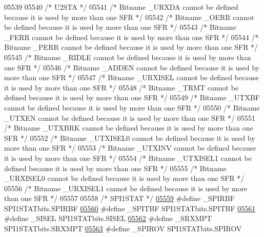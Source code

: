 \begin{DoxyCode}
05539 
05540 \textcolor{comment}{/* U2STA */}
05541 \textcolor{comment}{/* Bitname \_URXDA cannot be defined because it is used by more than one SFR */}
05542 \textcolor{comment}{/* Bitname \_OERR cannot be defined because it is used by more than one SFR */}
05543 \textcolor{comment}{/* Bitname \_FERR cannot be defined because it is used by more than one SFR */}
05544 \textcolor{comment}{/* Bitname \_PERR cannot be defined because it is used by more than one SFR */}
05545 \textcolor{comment}{/* Bitname \_RIDLE cannot be defined because it is used by more than one SFR */}
05546 \textcolor{comment}{/* Bitname \_ADDEN cannot be defined because it is used by more than one SFR */}
05547 \textcolor{comment}{/* Bitname \_URXISEL cannot be defined because it is used by more than one SFR */}
05548 \textcolor{comment}{/* Bitname \_TRMT cannot be defined because it is used by more than one SFR */}
05549 \textcolor{comment}{/* Bitname \_UTXBF cannot be defined because it is used by more than one SFR */}
05550 \textcolor{comment}{/* Bitname \_UTXEN cannot be defined because it is used by more than one SFR */}
05551 \textcolor{comment}{/* Bitname \_UTXBRK cannot be defined because it is used by more than one SFR */}
05552 \textcolor{comment}{/* Bitname \_UTXISEL0 cannot be defined because it is used by more than one SFR */}
05553 \textcolor{comment}{/* Bitname \_UTXINV cannot be defined because it is used by more than one SFR */}
05554 \textcolor{comment}{/* Bitname \_UTXISEL1 cannot be defined because it is used by more than one SFR */}
05555 \textcolor{comment}{/* Bitname \_URXISEL0 cannot be defined because it is used by more than one SFR */}
05556 \textcolor{comment}{/* Bitname \_URXISEL1 cannot be defined because it is used by more than one SFR */}
05557 
05558 \textcolor{comment}{/* SPI1STAT */}
\hypertarget{a00015_source_l05559}{}\hyperlink{a00015_ad14fb46d31b7217af0673d2c91f45734}{05559} \textcolor{preprocessor}{#define \_SPIRBF SPI1STATbits.SPIRBF}
\hypertarget{a00015_source_l05560}{}\hyperlink{a00015_a97399f3506368453ccdf4a152015396f}{05560} \textcolor{preprocessor}{#define \_SPITBF SPI1STATbits.SPITBF}
\hypertarget{a00015_source_l05561}{}\hyperlink{a00015_aeaf87947694bcec5e47ab4fb38c3ee40}{05561} \textcolor{preprocessor}{#define \_SISEL SPI1STATbits.SISEL}
\hypertarget{a00015_source_l05562}{}\hyperlink{a00015_a966c1dab06a08f4c44c632b66dadaf1d}{05562} \textcolor{preprocessor}{#define \_SRXMPT SPI1STATbits.SRXMPT}
\hypertarget{a00015_source_l05563}{}\hyperlink{a00015_abf1b272f53683ca9d8e5278b50eb85c2}{05563} \textcolor{preprocessor}{#define \_SPIROV SPI1STATbits.SPIROV}

\end{DoxyCode}
